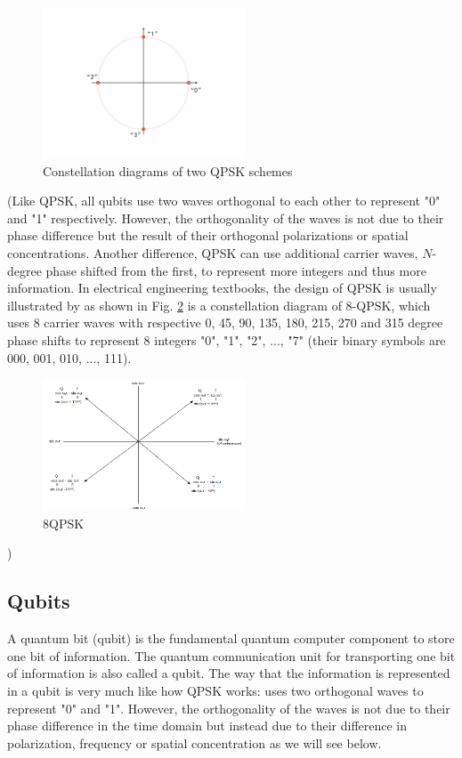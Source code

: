 \documentclass{book}
\begin{document}
\begin{figure}[ht]
\includegraphics[width=6cm]{pic/4qpsk.jpg}
\caption{Constellation diagrams of two QPSK schemes}
\label{QPSK}
\end{figure}

(Like QPSK, all qubits use two waves orthogonal to each other to represent "0" and "1" respectively. However, the orthogonality of the waves is not due to their phase difference but the result of their orthogonal polarizations or spatial concentrations. Another difference, QPSK can use additional carrier waves, $N$-degree phase shifted from the first, to represent more integers and thus more information. In electrical engineering textbooks, the design of QPSK is usually illustrated by as shown in Fig. \ref{8QPSK} is a constellation diagram of 8-QPSK, which uses 8 carrier waves with respective 0, 45, 90, 135, 180, 215, 270 and 315 degree phase shifts to represent 8 integers "0", "1", "2", ..., "7" (their binary symbols are 000, 001, 010, ..., 111).
\begin{figure}[ht]
\includegraphics[width=6cm]{pic/8QPSK.png}
\caption{8QPSK}
\label{8QPSK}
\end{figure}
)

\subsection{Qubits}
A quantum bit (qubit) is the fundamental quantum computer component to store one bit of information. The quantum communication unit for transporting one bit of information is also called a qubit. The way that the information is represented in a qubit is very much like how QPSK works: uses two orthogonal waves to represent "0" and "1". However, the orthogonality of the waves is not due to their phase difference in the time domain but instead due to their difference in polarization, frequency or spatial concentration as we will see below. 
\end{document}
